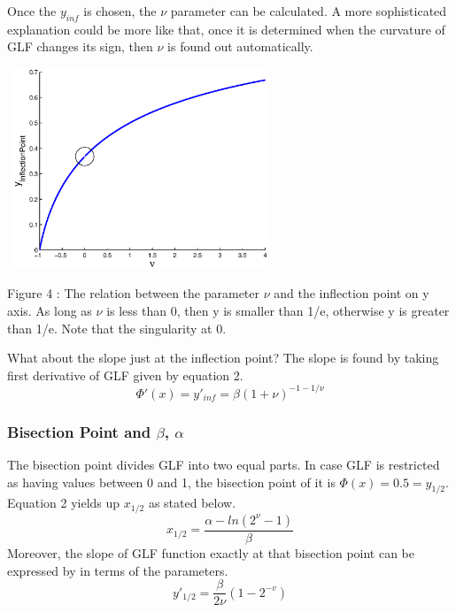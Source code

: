 \documentclass[twocolumn]{article}
\begin{document}
Once the $y_{inf}$ is chosen, the $\nu$ parameter can be calculated. A more sophisticated explanation could be more like that, once it is determined when the curvature of GLF changes its sign, then $\nu$ is found out automatically.  

\begin{center}
\includegraphics[width=80mm,height=60mm]{inflection_point.eps} 
   \begin{footnotesize} Figure 4 : The relation between the parameter $\nu$ and the inflection point on y axis. As long as $\nu$ is less than 0, then y is smaller than 1/e, otherwise y is greater than 1/e. Note that the singularity at 0.  \end{footnotesize}
\end{center}

What about the slope just at the inflection point? The slope is found by taking first derivative of GLF given by equation 2. 
\begin{equation*}
\Phi'(x)=y'_{inf}=\beta(1+\nu)^{-1-1/\nu}   
\end{equation*}

\subsubsection{Bisection Point and $\beta$, $\alpha$}
The bisection point divides GLF into two equal parts. In case GLF is restricted as having values between 0 and 1, the bisection point of it is $\Phi(x)=0.5=y_{1/2}$. Equation 2 yields up $x_{1/2}$ as stated below.
\begin{equation*}
 x_{1/2}=\dfrac{\alpha-ln(2^{\nu}-1)}{\beta}
\end{equation*}
Moreover, the slope of GLF function exactly at that bisection point can be expressed by in terms of the parameters. 
\begin{equation*}
 y'_{1/2}=\dfrac{\beta}{2\nu}(1-2^{-v})
\end{equation*}
\end{document}
